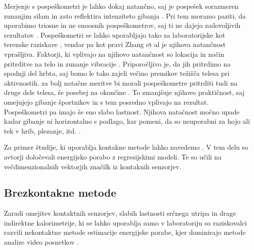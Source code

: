 Merjenje s pospeškometri je lahko dokaj natančno, saj je pospešek sorazmeren zunanjim silam in zato reflektira intenziteto gibanja \cite{yang2010review}. Pri tem moramo paziti, da uporabimo triosne in ne enoosnih pospeškometrov, saj ti ne dajejo zadovoljivih rezultatov \cite{levine2005measurement}. Pospeškometri se lahko uporabljajo tako za laboratorijske kot terenske raziskave \cite{yang2014sleep}, vendar pa kot pravi Zhang et al \cite{zhang2004improving} je njihova natančnost vprašljiva. Faktorji, ki vplivajo na njihovo natančnost so lokacija in način pritrditve na telo in zunanje vibracije \cite{yang2010review}. Priporočljivo je, da jih pritrdimo na spodnji del hrbta, saj bomo le tako zajeli večino premikov težišča telesa pri aktivnostih. za bolj natačne meritve bi morali pospeškometre pritrditi tudi na druge dele telesa, še posebej na okončine \cite{yang2010review}. To zmanjšuje njihovo praktičnost, saj omejujejo gibanje športnikov in s tem posredno vplivajo na rezultat. Pospeškometri pa imajo še eno slabo lastnost. Njihova natačnost močno upade kadar gibanje ni horizontalno s podlago, kar pomeni, da so neuporabni za hojo ali tek v hrib, plezanje, itd. \cite{yang2010review}.

Za primer študije, ki uporablja kontakne metode lahko navedemo \cite{gjoreski2015context}. V tem delu so avtorji določevali energijsko porabo z regresijskimi modeli. Te so učili na večdimenzionalnih vektorjih značilk iz kontaknih senzorjev.






\subsection{Brezkontakne metode}

Zaradi omejitev kontaktnih senzorjev, slabih lastnosti srčnega utripa in drage indirektne kalorimetrije, ki se lahko uporablja samo v laboratoriju so raziskovalci razvili nekontaktne metode estimacije energijske porabe, kjer dominirajo metode analize video posnetkov \cite{botton2011energy,osgnach2010energy,silva2015assessing,peker2004framework,nathan2015estimating}. 
